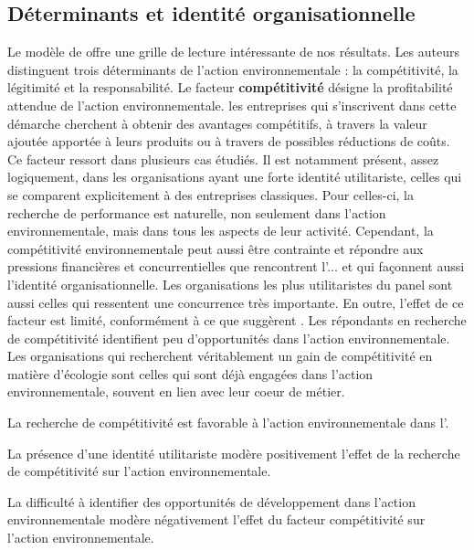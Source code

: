     \subsection{Déterminants et identité organisationnelle}

        Le modèle de \textcite{bansal2000why} offre une grille de lecture intéressante de nos résultats. Les auteurs distinguent trois déterminants de l'action environnementale : la compétitivité, la légitimité et la responsabilité. Le facteur \textbf{compétitivité} désigne la profitabilité attendue de l'action environnementale. les entreprises qui s'inscrivent dans cette démarche cherchent à obtenir des avantages compétitifs, à travers la valeur ajoutée apportée à leurs produits ou à travers de possibles réductions de coûts. Ce facteur ressort dans plusieurs cas étudiés. Il est notamment présent, assez logiquement, dans les organisations ayant une forte identité utilitariste, celles qui se comparent explicitement à des entreprises classiques. Pour celles-ci, la recherche de performance est naturelle, non seulement dans l'action environnementale, mais dans tous les aspects de leur activité. Cependant, la compétitivité environnementale peut aussi être contrainte et répondre aux pressions financières et concurrentielles que rencontrent l'\ess... et qui façonnent aussi l'identité organisationnelle. Les organisations les plus utilitaristes du panel sont aussi celles qui ressentent une concurrence très importante.  En outre, l'effet de ce facteur est limité, conformément à ce que suggèrent \textcite{dart2010green}. Les répondants en recherche de compétitivité identifient peu d'opportunités dans l'action environnementale. Les organisations qui recherchent véritablement un gain de compétitivité en matière d'écologie sont celles qui sont déjà engagées dans l'action environnementale, souvent en lien avec leur coeur de métier.

        \begin{hyp}
        \label{prop:DET1a}
            La recherche de compétitivité est favorable à l'action environnementale dans l'\ess.
        \end{hyp}

        \begin{hyp}
        \label{prop:DET1b}
            La présence d'une identité utilitariste modère positivement l'effet de la recherche de compétitivité sur l'action environnementale.
        \end{hyp}

        \begin{hyp}
        \label{prop:DET1c}
            La difficulté à identifier des opportunités de développement dans l'action environnementale modère négativement l'effet du facteur compétitivité sur l'action environnementale.
        \end{hyp}

